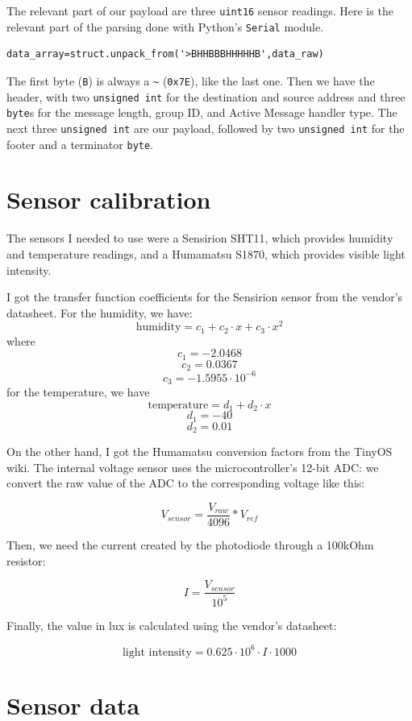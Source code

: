 \documentclass[11pt]{article}
\begin{document}
The relevant part of our payload are three \texttt{uint16} sensor readings. Here is the relevant part of the parsing done with Python's \texttt{Serial} module.

\begin{lstlisting}
data_array=struct.unpack_from('>BHHBBBHHHHHB',data_raw)
\end{lstlisting}

The first byte (\texttt{B}) is always a \texttt{\~} (\texttt{0x7E}), like the last one. Then we have the header, with two \texttt{unsigned int} for the destination and source address and three \texttt{byte}s for the message length, group ID, and Active Message handler type. The next three \texttt{unsigned int} are our payload, followed by two \texttt{unsigned int} for the footer and a terminator \texttt{byte}.

\section{Sensor calibration}
The sensors I needed to use were a Sensirion SHT11, which provides humidity and temperature readings, and a Humamatsu S1870, which provides visible light intensity. 

I got the transfer function coefficients for the Sensirion sensor from the vendor's datasheet. For the humidity, we have:
$$\text{humidity}=c_1+c_2\cdot x +c_3\cdot x^2$$
where
$$c_1= -2.0468$$
$$c_2=  0.0367$$
$$c_3= -1.5955\cdot10^{-6}$$
for the temperature, we have
$$\text{temperature}=d_1+d_2\cdot x$$ 
$$d_1= -40$$
$$d_2=  0.01$$

On the other hand, I got the Humamatsu conversion factors from the TinyOS wiki. The internal voltage sensor uses the microcontroller's 12-bit ADC: we convert the raw value of the ADC to the corresponding voltage like this:

$$ V_{sensor}=\frac{V_{raw}}{4096} * V_{ref} $$ 

Then, we need the current created by the photodiode through a 100kOhm resistor:

$$I = \frac{ V_{sensor} }{10^5}$$

Finally, the value in lux is calculated using the vendor's datasheet: 

$$\text{light intensity} = 0.625\cdot10^6 \cdot I \cdot 1000$$
  

\section{Sensor data}
\end{document}
